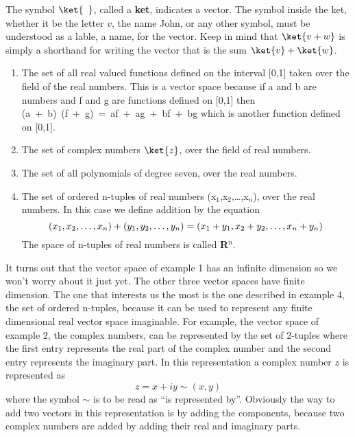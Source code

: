 The symbol $\ket{\phantom{v}}$, called a \textbf{ket}, indicates a vector.
The symbol inside the ket, whether it be the letter $v$, the name John, or any other symbol, must be understood as a lable, a name, for the vector.
Keep in mind that $\ket{v+w}$ is simply a shorthand for writing the vector that is the sum $\ket{v} + \ket{w}$.

\begin{enumerate}
\item The set of all real valued functions defined on the interval [0,1] taken over the field of the real numbers.  This is a vector space because if a and b are numbers and f and g are functions defined on [0,1] then \mbox{(a + b) (f + g) = af + ag + bf + bg} which is another function defined on [0,1].
\item The set of complex numbers $\ket{z}$, over the field of real numbers.
\item The set of all polynomials of degree seven, over the real numbers.
\item The set of ordered n-tuples of real numbers (x$_{1}$,x$_{2}$,\ldots ,x$_{n}$), over the real numbers.
In this case we define addition by the equation
\begin{equation}
(x_{1},x_{2},\ldots ,x_{n}) + (y_{1},y_{2},\ldots ,y_{n}) = (x_{1}+y_{1},x_{2}+y_{2},\ldots ,x_{n}+y_{n})\\
\end{equation}
The space of n-tuples of real numbers is called \textbf{R}$^{n}$.
\end{enumerate}

It turns out that the vector space of example 1 has an infinite dimension so we won't worry about it just yet.
The other three vector spaces have finite dimension.
The one that interests us the most is the one described in example 4, the set of ordered n-tuples, because it can be used to represent any finite dimensional real vector space imaginable.
For example, the vector space of example 2, the complex numbers, can be represented by the set of 2-tuples where the first entry represents the real part of the complex number and the second entry represents the imaginary part.
In this representation a complex number $z$ is represented as
\begin{equation}
z = x + iy \sim (x,y)
\end{equation}
where the symbol $\sim$ is to be read as ``is represented by''.
Obviously the way to add two vectors in this representation is by adding the components, because two complex numbers are added by adding their real and imaginary parts.

